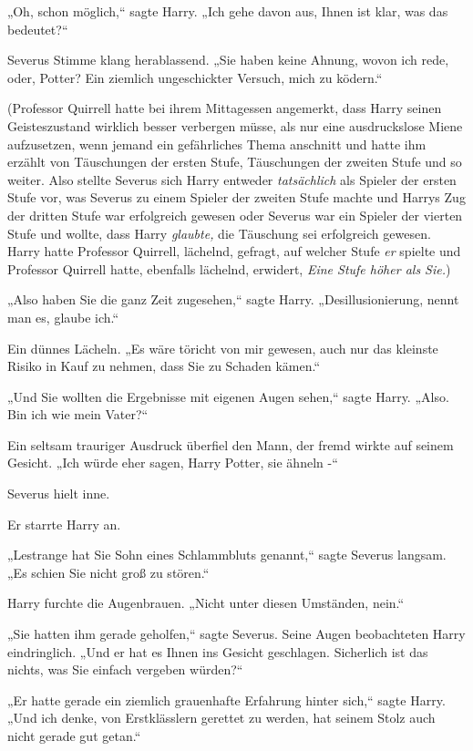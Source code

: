 {„Oh, schon möglich,“ sagte Harry. „Ich gehe davon aus, Ihnen ist klar, was das bedeutet?“

Severus Stimme klang herablassend. „Sie haben keine Ahnung, wovon ich rede, oder, Potter? Ein ziemlich ungeschickter Versuch, mich zu ködern.“

(Professor Quirrell hatte bei ihrem Mittagessen angemerkt, dass Harry seinen Geisteszustand wirklich besser verbergen müsse, als nur eine ausdruckslose Miene aufzusetzen, wenn jemand ein gefährliches Thema anschnitt und hatte ihm erzählt von Täuschungen der ersten Stufe, Täuschungen der zweiten Stufe und so weiter. Also stellte Severus sich Harry entweder \emph{tatsächlich} als Spieler der ersten Stufe vor, was Severus zu einem Spieler der zweiten Stufe machte und Harrys Zug der dritten Stufe war erfolgreich gewesen oder Severus war ein Spieler der vierten Stufe und wollte, dass Harry \emph{glaubte,} die Täuschung sei erfolgreich gewesen. Harry hatte Professor Quirrell, lächelnd, gefragt, auf welcher Stufe \emph{er} spielte und Professor Quirrell hatte, ebenfalls lächelnd, erwidert, \emph{Eine Stufe höher als Sie.})

„Also haben Sie die ganz Zeit zugesehen,“ sagte Harry. „Desillusionierung, nennt man es, glaube ich.“

Ein dünnes Lächeln. „Es wäre töricht von mir gewesen, auch nur das kleinste Risiko in Kauf zu nehmen, dass Sie zu Schaden kämen.“

„Und Sie wollten die Ergebnisse mit eigenen Augen sehen,“ sagte Harry. „Also. Bin ich wie mein Vater?“

Ein seltsam trauriger Ausdruck überfiel den Mann, der fremd wirkte auf seinem Gesicht. „Ich würde eher sagen, Harry Potter, sie ähneln -“

Severus hielt inne.

Er starrte Harry an.

„Lestrange hat Sie Sohn eines Schlammbluts genannt,“ sagte Severus langsam. „Es schien Sie nicht groß zu stören.“

Harry furchte die Augenbrauen. „Nicht unter diesen Umständen, nein.“

„Sie hatten ihm gerade geholfen,“ sagte Severus. Seine Augen beobachteten Harry eindringlich. „Und er hat es Ihnen ins Gesicht geschlagen. Sicherlich ist das nichts, was Sie einfach vergeben würden?“

„Er hatte gerade ein ziemlich grauenhafte Erfahrung hinter sich,“ sagte Harry. „Und ich denke, von Erstklässlern gerettet zu werden, hat seinem Stolz auch nicht gerade gut getan.“

}
